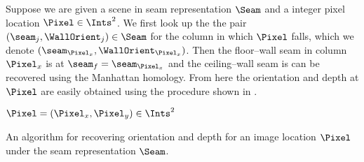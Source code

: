 Suppose we are given a scene in seam representation $\Seam$ and a
integer pixel location $\Pixel\in\Ints^2$. We first look up the the
pair $(\seam_j,\WallOrient_j)\in\Seam$ for the column in which $\Pixel$
falls, which we denote $(\seam_{\Pixel_x},\WallOrient_{\Pixel_x})$. Then
the floor--wall seam in column $\Pixel_x$ is at
$\seam_f=\seam_{\Pixel_x}$ and the ceiling--wall seam is can be
recovered using the Manhattan homology. From here the orientation and depth at
$\Pixel$ are easily obtained using the procedure shown in
.

\begin{algorithm}[tb]
  \label{alg:seam-depth-orient}
        \begin{algorithmic}
          \REQUIRE $\Pixel=(\Pixel_x,\Pixel_y)\in\Ints^2$
          \STATE{}
          \ELSE
          \ENDIF
        \end{algorithmic}
  \caption{An algorithm for recovering orientation and depth for an
    image location $\Pixel$ under the seam representation $\Seam$.}
\end{algorithm}

